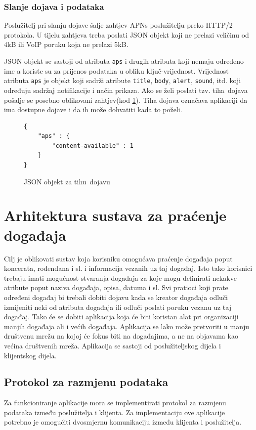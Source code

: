 \documentclass[times, utf8, zavrsni]{fer}
\begin{document}
{\subsection{Slanje dojava i podataka}
Poslužitelj pri slanju dojave šalje zahtjev APNs poslužitelju preko HTTP/2 protokola. U tijelu zahtjeva treba poslati JSON objekt koji ne prelazi veličinu od 4kB ili 	VoIP poruku koja ne prelazi 5kB.

JSON objekt se sastoji od atributa {\tt aps} i drugih atributa koji nemaju određeno ime a koriste su za prijenos podataka u obliku ključ-vrijednost. Vrijednost atributa {\tt aps} je objekt koji sadrži atribute {\tt title}, {\tt body}, {\tt alert}, {\tt sound}, itd. koji određuju sadržaj notifikacije i način prikaza. Ako se želi poslati tzv. \glqq tiha\grqq\  dojava pošalje se posebno oblikovani zahtjev(kod \ref{lst:tiha-dojava}). Tiha dojava označava aplikaciji da ima dostupne dojave i da ih može dohvatiti kada to poželi.\citep{apns2017}

\begin{figure}[t!]
\begin{lstlisting}
{
    "aps" : {
        "content-available" : 1
    }
}
\end{lstlisting}
\caption{JSON objekt za \glqq tihu\grqq\  dojavu}
\label{lst:tiha-dojava}
\end{figure}

\chapter{Arhitektura sustava za praćenje događaja}
\label{chp:architecture}

Cilj je oblikovati sustav koja korisniku omogućava praćenje događaja poput koncerata, rođendana i sl. i informacija vezanih uz taj događaj. Isto tako korisnici trebaju imati mogućnost stvaranja događaja za koje mogu definirati nekakve atribute poput naziva događaja, opisa, datuma i sl. Svi pratioci koji prate određeni događaj bi trebali dobiti dojavu kada se kreator događaja odluči izmijeniti neki od atributa događaja ili odluči poslati poruku vezanu uz taj događaj. Tako će se dobiti aplikacija koja će biti koristan alat pri organizaciji manjih događaja ali i većih događaja. Aplikacija se lako može pretvoriti u manju društvenu mrežu na kojoj će fokus biti na događajima, a ne na objavama kao većina društvenih mreža. Aplikacija se sastoji od poslužiteljskog dijela i klijentskog dijela.

\section{Protokol za razmjenu podataka}
Za funkcioniranje aplikacije mora se implementirati protokol za razmjenu podataka između poslužitelja i klijenta. Za implementaciju ove aplikacije potrebno je omogućiti dvosmjernu komunikaciju između klijenta i poslužitelja.

}
\end{document}
